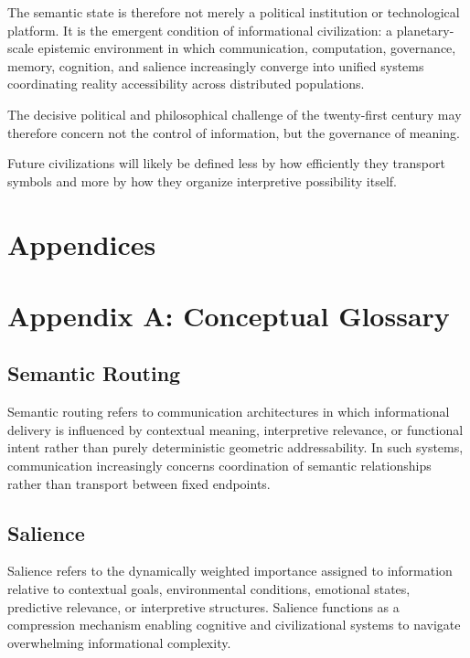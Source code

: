 \documentclass[11pt,a4paper]{article}
\begin{document}
The semantic state is therefore not merely a political institution or technological platform. It is the emergent condition of informational civilization: a planetary-scale epistemic environment in which communication, computation, governance, memory, cognition, and salience increasingly converge into unified systems coordinating reality accessibility across distributed populations.

The decisive political and philosophical challenge of the twenty-first century may therefore concern not the control of information, but the governance of meaning.

Future civilizations will likely be defined less by how efficiently they transport symbols and more by how they organize interpretive possibility itself.


\newpage
\section*{Appendices}

\appendix

\section{Appendix A: Conceptual Glossary}

\subsection{Semantic Routing}

Semantic routing refers to communication architectures in which informational delivery is influenced by contextual meaning, interpretive relevance, or functional intent rather than purely deterministic geometric addressability. In such systems, communication increasingly concerns coordination of semantic relationships rather than transport between fixed endpoints.

\subsection{Salience}

Salience refers to the dynamically weighted importance assigned to information relative to contextual goals, environmental conditions, emotional states, predictive relevance, or interpretive structures. Salience functions as a compression mechanism enabling cognitive and civilizational systems to navigate overwhelming informational complexity.
\end{document}
